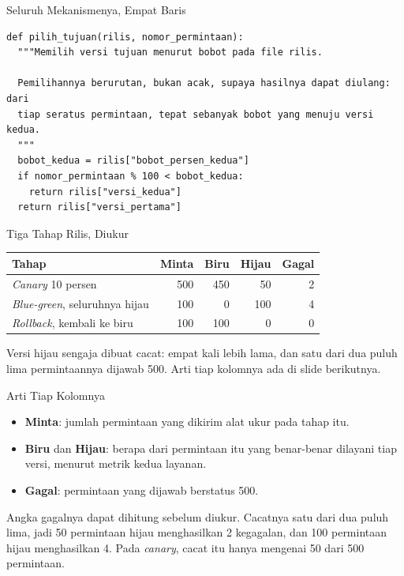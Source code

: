 \documentclass[aspectratio=169, table, 12pt]{beamer}
\begin{document}
\begin{frame}[fragile]{{\Large Seluruh Mekanismenya, Empat Baris}}
  \vspace{2pt}
\begin{lstlisting}[style=PythonStyle]
def pilih_tujuan(rilis, nomor_permintaan):
  """Memilih versi tujuan menurut bobot pada file rilis.

  Pemilihannya berurutan, bukan acak, supaya hasilnya dapat diulang: dari
  tiap seratus permintaan, tepat sebanyak bobot yang menuju versi kedua.
  """
  bobot_kedua = rilis["bobot_persen_kedua"]
  if nomor_permintaan % 100 < bobot_kedua:
    return rilis["versi_kedua"]
  return rilis["versi_pertama"]
\end{lstlisting}
\end{frame}

\begin{frame}{{\Large Tiga Tahap Rilis, Diukur}}
  \vspace{6pt}
  \centering
  {\footnotesize
  \begin{tabularx}{\textwidth}{Yrrrr}
    \hline
    \textbf{Tahap} & \textbf{Minta} & \textbf{Biru} & \textbf{Hijau} & \textbf{Gagal} \\
    \hline
    \textit{Canary} 10 persen & 500 & 450 & 50 & 2 \\
    \hline
    \textit{Blue-green}, seluruhnya hijau & 100 & 0 & 100 & 4 \\
    \hline
    \textit{Rollback}, kembali ke biru & 100 & 100 & 0 & 0 \\
    \hline
  \end{tabularx}}

  \vspace{8pt}
  {\small Versi hijau sengaja dibuat cacat: empat kali lebih lama, dan satu
  dari dua puluh lima permintaannya dijawab 500. Arti tiap kolomnya ada di
  slide berikutnya.}
\end{frame}

\begin{frame}{{\Large Arti Tiap Kolomnya}}
  \vspace{10pt}
  \begin{itemize}
    \item \textbf{Minta}: jumlah permintaan yang dikirim alat ukur pada
          tahap itu.
    \item \textbf{Biru} dan \textbf{Hijau}: berapa dari permintaan itu yang
          benar-benar dilayani tiap versi, menurut metrik kedua layanan.
    \item \textbf{Gagal}: permintaan yang dijawab berstatus 500.
  \end{itemize}
  \vspace{8pt}
  {\small Angka gagalnya dapat dihitung sebelum diukur. Cacatnya satu dari
  dua puluh lima, jadi 50 permintaan hijau menghasilkan 2 kegagalan, dan 100
  permintaan hijau menghasilkan 4. Pada \textit{canary}, cacat itu hanya
  mengenai 50 dari 500 permintaan.}
\end{frame}
\end{document}

